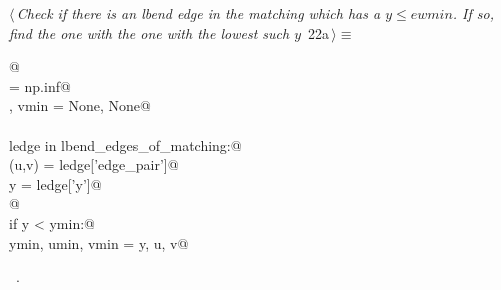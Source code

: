 \documentclass[10pt, english, oneside]{report}
\begin{document}
\begin{flushleft} \small
\begin{minipage}{\linewidth}\label{scrap24}\raggedright\small
{} $\langle\,${\itshape Check if there is an lbend edge in the matching which has a $y\leq ewmin$. If so, find the one with the one with the lowest such $y$}\nobreak\ {\footnotesize {22a}}$\,\rangle\equiv$
\vspace{-1ex}
\begin{list}{}{} \item
\mbox{}\verb@   @\\
\mbox{}\verb@ymin       = np.inf@\\
\mbox{}\verb@umin, vmin = None, None@\\
\mbox{}\verb@@\\
\mbox{}\verb@for ledge in lbend_edges_of_matching:@\\
\mbox{}\verb@    (u,v) = ledge['edge_pair']@\\
\mbox{}\verb@    y     = ledge['y']@\\
\mbox{}\verb@    @\\
\mbox{}\verb@    if y < ymin:@\\
\mbox{}\verb@        ymin, umin, vmin = y, u, v@\\
\mbox{}\verb@@{\NWsep}
\end{list}
\vspace{-1.5ex}
\footnotesize
\begin{list}{}{\setlength{\itemsep}{-\parsep}\setlength{\itemindent}{-\leftmargin}}
\item \NWtxtMacroRefIn\ .

\item{}
\end{list}
\end{minipage}\vspace{4ex}
\end{flushleft}
\end{document}
